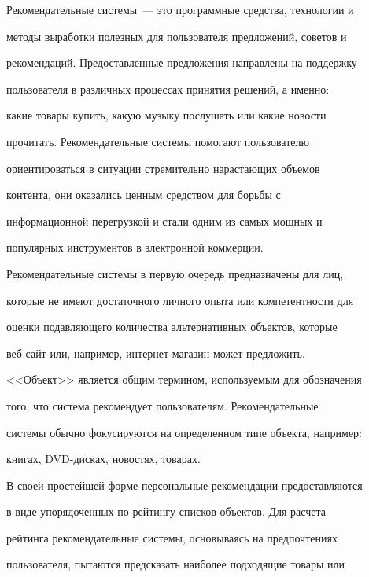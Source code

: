 Рекомендательные системы~--- это программные средства, технологии и


методы выработки полезных для пользователя предложений, советов и


рекомендаций. Предоставленные предложения направлены на поддержку


пользователя в различных процессах принятия решений, а именно:


какие товары купить, какую музыку послушать или какие новости


прочитать. Рекомендательные системы помогают пользователю


ориентироваться в ситуации стремительно нарастающих объемов


контента, они оказались ценным средством для борьбы с


информационной перегрузкой и стали одним из самых мощных и


популярных инструментов в электронной коммерции.





Рекомендательные системы в первую очередь предназначены для лиц,


которые не имеют достаточного личного опыта или компетентности для


оценки подавляющего количества альтернативных объектов, которые


веб-сайт или, например, ин\-тер\-нет-ма\-га\-зин может предложить.








<<Объект>> является общим термином, используемым для обозначения


того, что система рекомендует пользователям. Рекомендательные


системы обычно фокусируются на определенном типе объекта, например:


книгах, DVD-дис\-ках, новостях, товарах.








В своей простейшей форме персональные рекомендации предоставляются


в виде упорядоченных по рейтингу списков объектов. Для расчета


рейтинга рекомендательные системы, основываясь на предпочтениях


пользователя, пытаются предсказать наиболее подходящие товары или


